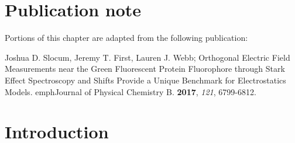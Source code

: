 \section{Publication note} \label{pKa-pub-note}

Portions of this chapter are adapted from the following publication: 

\noindent Joshua D. Slocum, Jeremy T. First, Lauren J. Webb; Orthogonal Electric Field Measurements near the Green Fluorescent Protein Fluorophore through Stark Effect Spectroscopy and \pKa{} Shifts Provide a Unique Benchmark for Electrostatics Models. emph{Journal of Physical Chemistry B}. \textbf{2017}, \emph{121}, 6799-6812.




\section{Introduction} \label{pKa-intro}

